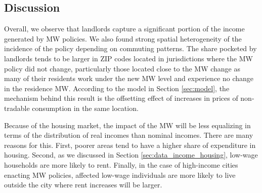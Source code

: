 \subsection{Discussion}\label{sec:discussion_cf}

Overall, we observe that landlords capture a significant portion of the income 
generated by MW policies.
We also found strong spatial heterogeneity of the incidence of the policy 
depending on commuting patterns.
The share pocketed by landlords tends to be larger in ZIP codes located in 
jurisdictions where the MW policy did not change,
particularly those located close to the MW change as many of their residents
work under the new MW level and experience no change in the residence MW.
According to the model in Section \ref{sec:model}, the mechanism behind
this result is the offsetting effect of increases in prices of non-tradable 
consumption in the same location.

Because of the housing market, 
the impact of the MW will be less equalizing in terms of the distribution of
real incomes than nominal incomes.
There are many reasons for this.
First, poorer areas tend to have a higher share of expenditure in housing.
Second, as we discussed in Section \ref{sec:data_income_housing},
low-wage households are more likely to rent.
Finally, in the case of high-income cities enacting MW policies, affected 
low-wage individuals are more likely to live outside the city where rent
increases will be larger.
